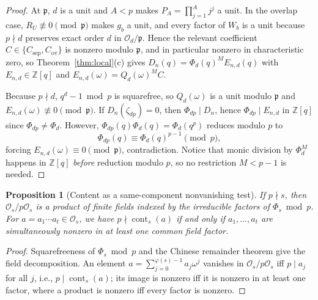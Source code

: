 \documentclass[11pt,reqno]{amsart}
\numberwithin{equation}{section}
\newtheorem{proposition}[theorem]{Proposition}
\theoremstyle{definition}
\theoremstyle{remark}
\newcommand{\Z}{\mathbb{Z}}
\newcommand{\cont}{\operatorname{cont}}
\begin{document}
\begin{proof}
At $\mathfrak{p}$, $d$ is a unit and $A<p$ makes $P_A=\prod_{j=1}^A j^j$ a unit. In the overlap case, $R_U\not\equiv 0\pmod{\mathfrak{p}}$ makes $g_b$ a unit, and every factor of $W_b$ is a unit because $p\nmid d$ preserves exact order $d$ in $\mathcal{O}_d/\mathfrak{p}$. Hence the relevant coefficient $C\in\{C_{\mathrm{sep}},C_{\mathrm{ov}}\}$ is nonzero modulo $\mathfrak{p}$, and in particular nonzero in characteristic zero, so Theorem~\ref{thm:local}(c) gives $D_n(q)=\Phi_d(q)^M E_{n,d}(q)$ with $E_{n,d}\in\Z[q]$ and $E_{n,d}(\omega)=Q_d(\omega)^M C$.

Because $p\nmid d$, $q^d-1\bmod p$ is squarefree, so $Q_d(\omega)$ is a unit modulo $\mathfrak{p}$ and $E_{n,d}(\omega)\not\equiv 0\pmod{\mathfrak{p}}$. If $D_n(\zeta_{dp})=0$, then $\Phi_{dp}\mid D_n$, hence $\Phi_{dp}\mid E_{n,d}$ in $\Z[q]$ since $\Phi_{dp}\neq\Phi_d$. However, $\Phi_{dp}(q)\Phi_d(q)=\Phi_d(q^p)$ reduces modulo $p$ to
\begin{equation}
\label{eq:cyclo-ram}
\Phi_{dp}(q)\equiv \Phi_d(q)^{p-1}\pmod p,
\end{equation}
forcing $E_{n,d}(\omega)\equiv 0\pmod{\mathfrak{p}}$, contradiction. Notice that monic division by $\Phi_d^M$ happens in $\Z[q]$ \emph{before} reduction modulo $p$, so no restriction $M<p-1$ is needed.
\end{proof}

\begin{proposition}[Content as a same-component nonvanishing test]
\label{prop:content-test}
If $p\nmid s$, then $\mathcal{O}_s/p\mathcal{O}_s$ is a product of finite fields indexed by the irreducible factors of $\Phi_s\bmod p$. For $a=a_1\cdots a_t\in\mathcal{O}_s$, we have $p\nmid \cont_s(a)$ if and only if $a_1,\ldots,a_t$ are \emph{simultaneously} nonzero in at least one common field factor.
\end{proposition}

\begin{proof}
Squarefreeness of $\Phi_s\bmod p$ and the Chinese remainder theorem give the field decomposition. An element $a=\sum_{j=0}^{\varphi(s)-1}a_j\omega^j$ vanishes in $\mathcal{O}_s/p\mathcal{O}_s$ iff $p\mid a_j$ for all $j$, i.e., $p\mid \cont_s(a)$; its image is nonzero iff it is nonzero in at least one factor, where a product is nonzero iff every factor is nonzero.
\end{proof}
\end{document}
